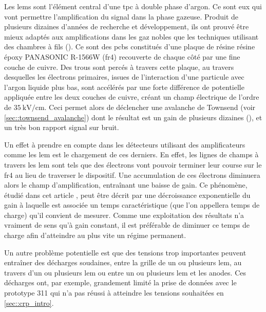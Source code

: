             Les \glspl{lem} sont l'élément central d'une \gls{tpc} à double phase d'argon. Ce sont eux qui vont permettre l'amplification du signal dans la phase gazeuse. Produit de plusieurs dizaines d'années de recherche et développement, ils ont prouvé être mieux adaptés aux amplifications dans les gaz nobles que les techniques utilisant des chambres à fils (\cite{Buzulutskov2000,Breskin2008}). Ce sont des \glspl{pcb} constitués d'une plaque de résine résine époxy PANASONIC R-1566W (\gls{fr4}) recouverte de chaque côté par une fine couche de cuivre. Des trous sont percés à travers cette plaque, au travers desquelles les électrons primaires, issues de l'interaction d'une particule avec l'argon liquide plus bas, sont accélérés par une forte différence de potentielle appliquée entre les deux couches de cuivre, créant un champ électrique de l'ordre de $\SI{35}{\kilo\volt\per\centi\meter}$. Ceci permet alors de déclencher une avalanche de Townsend (voir \autoref{sec::townsend_avalanche}) dont le résultat est un gain de plusieurs dizaines (\cite{Cantini2014}), et un très bon rapport signal sur bruit.
            
            Un effet à prendre en compte dans les détecteurs utilisant des amplificateurs comme les \gls{lem} est le chargement de ces derniers. En effet, les lignes de champs à travers les \gls{lem} sont tels que des électrons vont pouvoir terminer leur course sur le \gls{fr4} au lieu de traverser le dispositif. Une accumulation de ces électrons diminuera alors le champ d'amplification, entraînant une baisse de gain. Ce phénomène, étudié dans cet article \cite{Cantini2014}, peut être décrit par une décroissance exponentielle du gain à laquelle est associée un temps caractéristique (que l'on appellera temps de charge) qu'il convient de mesurer. Comme une exploitation des résultats n'a vraiment de sens qu'à gain constant, il est préférable de diminuer ce temps de charge afin d'atteindre au plus vite un régime permanent.
            
            Un autre problème potentielle est que des tensions trop importantes peuvent entraîner des décharges soudaines, entre la grille de un ou plusieurs \gls{lem}, au travers d'un ou plusieurs \gls{lem} ou entre un ou plusieurs \gls{lem} et les anodes. Ces décharges ont, par exemple, grandement limité la prise de données avec le prototype 311 qui n'a pas réussi à atteindre les tensions souhaitées en \autoref{sec::crp_intro}.
            
